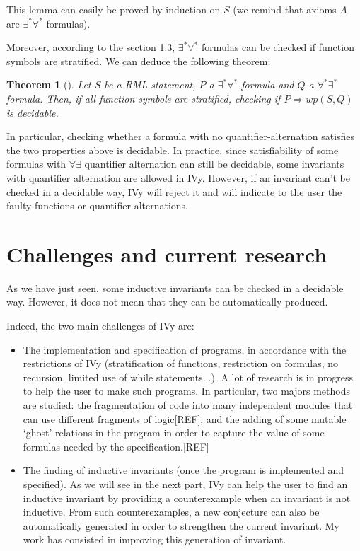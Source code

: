 \documentclass[11pt,a4paper,oldfontcommands]{memoir}
\newtheorem*{theorem}{Theorem}
\begin{document}
    This lemma can easily be proved by induction on \(S\) (we remind that axioms \(A\) are \(\exists^*\forall^*\) formulas).
    
    Moreover, according to the section 1.3, \(\exists^*\forall^*\) formulas can be checked if function symbols are stratified.
    We can deduce the following theorem:

    \begin{theorem}[]
        Let \(S\) be a RML statement, \(P\) a \(\exists^*\forall^*\) formula and \(Q\) a \(\forall^*\exists^*\) formula.
        Then, if all function symbols are stratified, checking if \( P \Rightarrow wp(S,Q) \) is decidable.
    \end{theorem}

    In particular, checking whether a formula with no quantifier-alternation satisfies the two properties above is decidable.
    In practice, since satisfiability of some formulas with \( \forall\exists \) quantifier alternation can still be decidable,
    some invariants with quantifier alternation are allowed in IVy. However, if an invariant can't be checked in a decidable way, IVy will reject it
    and will indicate to the user the faulty functions or quantifier alternations.

    \section{Challenges and current research}

    As we have just seen, some inductive invariants can be checked in a decidable way.
    However, it does not mean that they can be automatically produced.

    Indeed, the two main challenges of IVy are:
    \begin{itemize}
        \item The implementation and specification of programs, in accordance with the restrictions of IVy
        (stratification of functions, restriction on formulas, no recursion, limited use of while statements...).
        A lot of research is in progress to help the user to make such programs. In particular, two majors methods are
        studied: the fragmentation of code into many independent modules that can use different fragments of logic[REF],
        and the adding of some mutable `ghost' relations in the program in order to capture the value of some formulas needed by the specification.[REF]
        
        \item The finding of inductive invariants (once the program is implemented and specified). As we will see in the next part,
        IVy can help the user to find an inductive invariant by providing a counterexample when an invariant is not inductive.
        From such counterexamples, a new conjecture can also be automatically generated in order to strengthen the current invariant.
        My work has consisted in improving this generation of invariant.
    \end{itemize}
\end{document}
